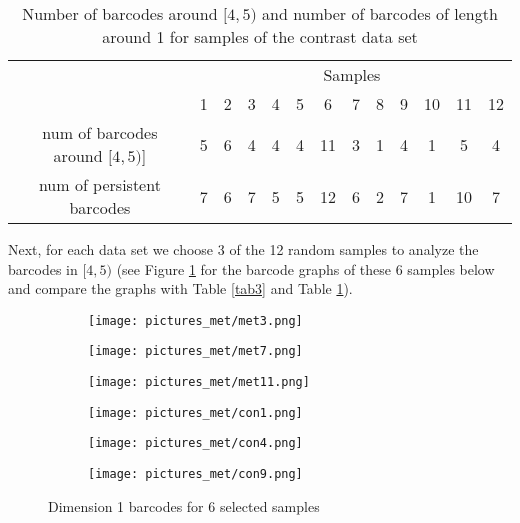 \documentclass[12pt]{article}
\theoremstyle{definition}
\begin{document}
\begin{table}[!htbp]
        \centering
        \begin{tabular}{c|c|c|c|c|c|c|c|c|c|c|c|c|}
            \cline{2-13}
             & \multicolumn{12}{|c|}{Samples}\\
            \cline{2-13}
             & 1 & 2 & 3 & 4 & 5 & 6 & 7 & 8 & 9 & 10 & 11 & 12 \\
            \hline
            \multicolumn{1}{|c|}{num of barcodes around $[4, 5)$]} & 5 & 6 & 4 & 4 & 4 & 11 & 3 & 1 & 4 & 1 & 5 & 4 \\
            \hline
            \multicolumn{1}{|c|}{num of persistent barcodes} & 7 & 6 & 7 & 5 & 5 & 12 & 6 & 2 & 7 & 1 & 10 & 7 \\
            \hline
        \end{tabular}
        \caption{Number of barcodes around $[4,5)$  and number of barcodes of length around 1 for samples of the contrast data set}
        \label{tab4}
    \end{table}
\par Next, for each data set we choose 3 of the 12 random samples to analyze the barcodes in $[4,5)$ (see  Figure \ref{metbarcodes} for the barcode graphs of these 6 samples below and compare the graphs with Table \ref{tab3} and Table \ref{tab4}). 
\begin{figure}[H]
\centering
\begin{subfigure}{.5\textwidth}
  \centering
  \texttt{[image: pictures\_met/met3.png]}
\end{subfigure}%
\begin{subfigure}{.5\textwidth}
  \centering
  \texttt{[image: pictures\_met/met7.png]} 
\end{subfigure}
\begin{subfigure}{.5\textwidth}
  \centering
  \texttt{[image: pictures\_met/met11.png]} 
\end{subfigure}%
\begin{subfigure}{.5\textwidth}
  \centering
  \texttt{[image: pictures\_met/con1.png]} 
\end{subfigure}
\begin{subfigure}{.5\textwidth}
  \centering
  \texttt{[image: pictures\_met/con4.png]} 
\end{subfigure}%
\begin{subfigure}{.5\textwidth}
  \centering
  \texttt{[image: pictures\_met/con9.png]} 
\end{subfigure}
\caption{Dimension 1 barcodes for 6 selected samples}
\label{metbarcodes}
\end{figure}
\end{document}

